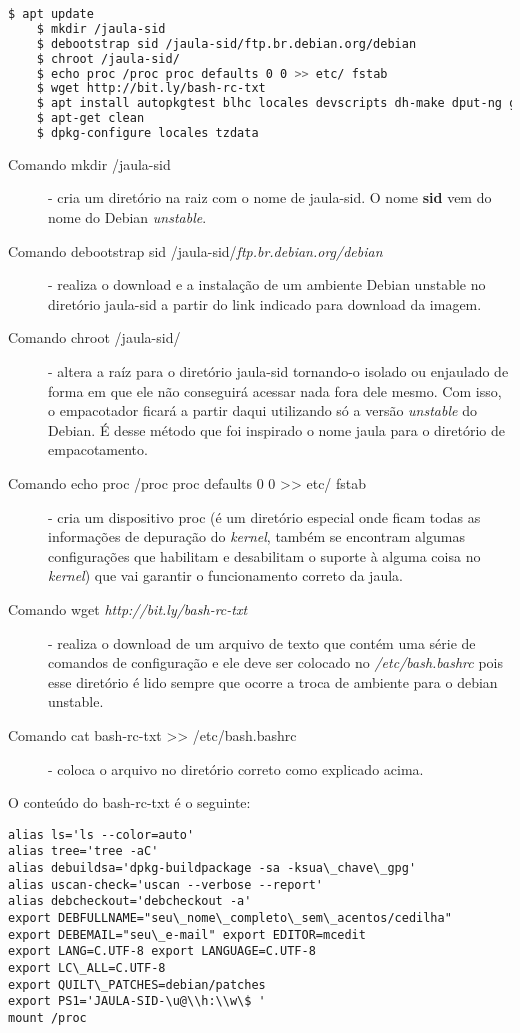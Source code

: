 \begin{lstlisting}[language=bash]
	$ apt update
	$ mkdir /jaula-sid
	$ debootstrap sid /jaula-sid/ftp.br.debian.org/debian
	$ chroot /jaula-sid/
	$ echo proc /proc proc defaults 0 0 >> etc/ fstab
	$ wget http://bit.ly/bash-rc-txt
	$ apt install autopkgtest blhc locales devscripts dh-make dput-ng git-buildpackage mc quilt spell tardiff tree lintian
	$ apt-get clean
	$ dpkg-configure locales tzdata
\end{lstlisting}

\begin{description}

	\item[Comando mkdir /jaula-sid] - cria um diretório na raiz com o nome de jaula-sid. O nome \textbf{sid} vem do nome do Debian \textit{unstable}.
	\item[Comando debootstrap sid /jaula-sid/\textit{ftp.br.debian.org/debian}] - realiza o download e a instalação de um ambiente Debian unstable no diretório jaula-sid a partir do link indicado para download da imagem.
	\item[Comando chroot /jaula-sid/] - altera a raíz para o diretório jaula-sid tornando-o isolado ou enjaulado de forma em que ele não conseguirá acessar nada fora dele mesmo. Com isso, o empacotador ficará a partir daqui utilizando só a versão \textit{unstable} do Debian. É desse método que foi inspirado o nome jaula para o diretório de empacotamento.
	\item[Comando echo proc /proc proc defaults 0 0 >> etc/ fstab] - cria um dispositivo proc (é um diretório especial onde ficam todas as informações de depuração do \textit{kernel}, também se encontram algumas configurações que habilitam e desabilitam o suporte à alguma coisa no \textit{kernel}) que vai garantir o funcionamento correto da jaula.
	\item[Comando wget \textit{http://bit.ly/bash-rc-txt}] - realiza o download de um arquivo de texto que contém uma série de comandos de configuração e ele deve ser colocado no \textit{/etc/bash.bashrc} pois esse diretório é lido sempre que ocorre a troca de ambiente para o debian unstable.
	\item[Comando cat bash-rc-txt >> /etc/bash.bashrc] - coloca o arquivo no diretório correto como explicado acima.

\end{description}

O conteúdo do bash-rc-txt é o seguinte:
\begin{verbatim}
alias ls='ls --color=auto' 
alias tree='tree -aC' 
alias debuildsa='dpkg-buildpackage -sa -ksua\_chave\_gpg' 
alias uscan-check='uscan --verbose --report' 
alias debcheckout='debcheckout -a' 
export DEBFULLNAME="seu\_nome\_completo\_sem\_acentos/cedilha" 
export DEBEMAIL="seu\_e-mail" export EDITOR=mcedit 
export LANG=C.UTF-8 export LANGUAGE=C.UTF-8 
export LC\_ALL=C.UTF-8 
export QUILT\_PATCHES=debian/patches 
export PS1='JAULA-SID-\u@\\h:\\w\$ ' 
mount /proc 
\end{verbatim}

